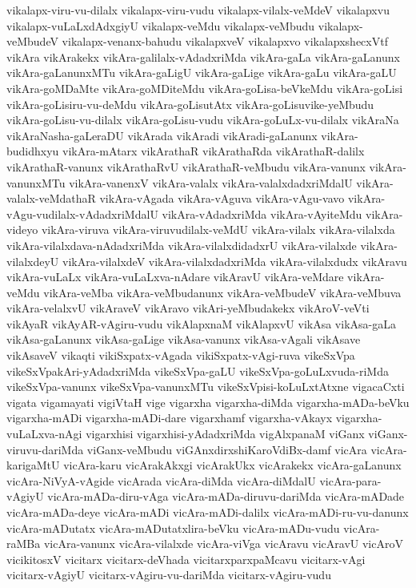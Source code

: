 {vikalapx-viru-vu-dilalx
vikalapx-viru-vudu
vikalapx-vilalx-veMdeV
vikalapxvu
vikalapx-vuLaLxdAdxgiyU
vikalapx-veMdu
vikalapx-veMbudu
vikalapx-veMbudeV
vikalapx-venanx-bahudu
vikalapxveV
vikalapxvo
vikalapxshecxVtf
vikAra
vikArakekx
vikAra-galilalx-vAdadxriMda
vikAra-gaLa
vikAra-gaLanunx
vikAra-gaLanunxMTu
vikAra-gaLigU
vikAra-gaLige
vikAra-gaLu
vikAra-gaLU
vikAra-goMDaMte
vikAra-goMDiteMdu
vikAra-goLisa-beVkeMdu
vikAra-goLisi
vikAra-goLisiru-vu-deMdu
vikAra-goLisutAtx
vikAra-goLisuvike-yeMbudu
vikAra-goLisu-vu-dilalx
vikAra-goLisu-vudu
vikAra-goLuLx-vu-dilalx
vikAraNa
vikAraNasha-gaLeraDU
vikArada
vikAradi
vikAradi-gaLanunx
vikAra-budidhxyu
vikAra-mAtarx
vikArathaR
vikArathaRda
vikArathaR-dalilx
vikArathaR-vanunx
vikArathaRvU
vikArathaR-veMbudu
vikAra-vanunx
vikAra-vanunxMTu
vikAra-vanenxV
vikAra-valalx
vikAra-valalxdadxriMdalU
vikAra-valalx-veMdathaR
vikAra-vAgada
vikAra-vAguva
vikAra-vAgu-vavo
vikAra-vAgu-vudilalx-vAdadxriMdalU
vikAra-vAdadxriMda
vikAra-vAyiteMdu
vikAra-videyo
vikAra-viruva
vikAra-viruvudilalx-veMdU
vikAra-vilalx
vikAra-vilalxda
vikAra-vilalxdava-nAdadxriMda
vikAra-vilalxdidadxrU
vikAra-vilalxde
vikAra-vilalxdeyU
vikAra-vilalxdeV
vikAra-vilalxdadxriMda
vikAra-vilalxdudx
vikAravu
vikAra-vuLaLx
vikAra-vuLaLxva-nAdare
vikAravU
vikAra-veMdare
vikAra-veMdu
vikAra-veMba
vikAra-veMbudanunx
vikAra-veMbudeV
vikAra-veMbuva
vikAra-velalxvU
vikAraveV
vikAravo
vikAri-yeMbudakekx
vikAroV-veVti
vikAyaR
vikAyAR-vAgiru-vudu
vikAlapxnaM
vikAlapxvU
vikAsa
vikAsa-gaLa
vikAsa-gaLanunx
vikAsa-gaLige
vikAsa-vanunx
vikAsa-vAgali
vikAsave
vikAsaveV
vikaqti
vikiSxpatx-vAgada
vikiSxpatx-vAgi-ruva
vikeSxVpa
vikeSxVpakAri-yAdadxriMda
vikeSxVpa-gaLU
vikeSxVpa-goLuLxvuda-riMda
vikeSxVpa-vanunx
vikeSxVpa-vanunxMTu
vikeSxVpisi-koLuLxtAtxne
vigacaCxti
vigata
vigamayati
vigiVtaH
vige
vigarxha
vigarxha-diMda
vigarxha-mADa-beVku
vigarxha-mADi
vigarxha-mADi-dare
vigarxhamf
vigarxha-vAkayx
vigarxha-vuLaLxva-nAgi
vigarxhisi
vigarxhisi-yAdadxriMda
vigAlxpanaM
viGanx
viGanx-viruvu-dariMda
viGanx-veMbudu
viGAnxdirxshiKaroVdiBx-damf
vicAra
vicAra-karigaMtU
vicAra-karu
vicArakAkxgi
vicArakUkx
vicArakekx
vicAra-gaLanunx
vicAra-NiVyA-vAgide
vicArada
vicAra-diMda
vicAra-diMdalU
vicAra-para-vAgiyU
vicAra-mADa-diru-vAga
vicAra-mADa-diruvu-dariMda
vicAra-mADade
vicAra-mADa-deye
vicAra-mADi
vicAra-mADi-dalilx
vicAra-mADi-ru-vu-danunx
vicAra-mADutatx
vicAra-mADutatxlira-beVku
vicAra-mADu-vudu
vicAra-raMBa
vicAra-vanunx
vicAra-vilalxde
vicAra-viVga
vicAravu
vicAravU
vicAroV
vicikitosxV
vicitarx
vicitarx-deVhada
vicitarxparxpaMcavu
vicitarx-vAgi
vicitarx-vAgiyU
vicitarx-vAgiru-vu-dariMda
vicitarx-vAgiru-vudu
}
